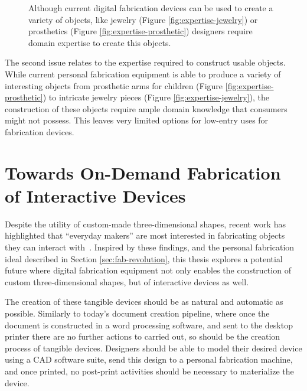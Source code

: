     \begin{figure}[h]
      \centering
      \label{}

      \caption{Although current digital fabrication devices can be used to
        create a variety of objects, like jewelry (Figure
        \ref{fig:expertise-jewelry}) or prosthetics (Figure
        \ref{fig:expertise-prosthetic}) designers require domain expertise to
        create this objects.}
    \end{figure}

    The second issue relates to the expertise required to construct usable
    objects. While current personal fabrication equipment is able to produce a
    variety of interesting objects from prosthetic arms for children (Figure
    \ref{fig:expertise-prosthetic}) to intricate jewelry pieces (Figure
    \ref{fig:expertise-jewelry}), the construction of these objects require
    ample domain knowledge that consumers might not possess.  This leaves very
    limited options for low-entry uses for fabrication devices.

  \section{Towards On-Demand Fabrication of Interactive Devices} \label{sec:on-demand}
    Despite the utility of custom-made three-dimensional shapes, recent work has
    highlighted that ``everyday makers'' are most interested in fabricating
    objects they can interact with~\cite{Shewbridge:2014}. Inspired by these
    findings, and the personal fabrication ideal described in Section
    \ref{sec:fab-revolution}, this thesis explores a potential future where
    digital fabrication equipment not only enables the construction of custom
    three-dimensional shapes, but of interactive devices as well.

    The creation of these tangible devices should be as natural and automatic as
    possible. Similarly to today's document creation pipeline, where once the
    document is constructed in a word processing software, and sent to the
    desktop printer there are no further actions to carried out, so should be
    the creation process of tangible devices. Designers should be able to model
    their desired device using a CAD software suite, send this design to a
    personal fabrication machine, and once printed, no post-print activities
    should be necessary to materialize the device.

